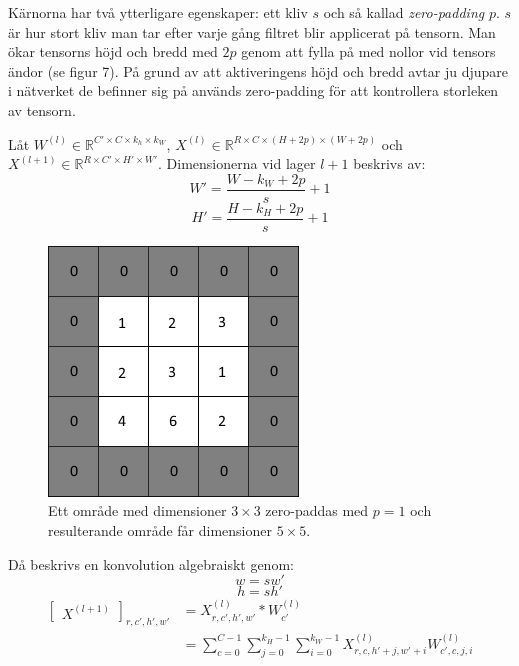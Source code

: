 \documentclass[a4paper,11pt,twoside]{article}
\begin{document}
Kärnorna har två ytterligare egenskaper: ett kliv $s$ och så kallad \textit{zero-padding} $p$. $s$ är hur stort kliv man tar efter varje gång filtret blir applicerat på tensorn. Man ökar tensorns höjd och bredd med $2p$ genom att fylla på med nollor vid tensors ändor (se figur 7). På grund av att aktiveringens höjd och bredd avtar ju djupare i nätverket de befinner sig på används zero-padding för att kontrollera storleken av tensorn. \cite{cs231n} \cite{convmath} \cite{convarithmetic}

Låt $W^{(l)} \in \mathbb{R}^{C' \times C  \times k_h \times k_W}$, $X^{(l)} \in \mathbb{R}^{R \times C  \times (H+2p) \times (W+2p)}$ och $X^{(l+1)} \in \mathbb{R}^{R \times C'  \times H' \times W'}$. Dimensionerna vid lager $l+1$ beskrivs av: \cite{cs231n} \cite{convmath} \cite{convarithmetic}
\begin{equation}
W' = \frac{W-k_W+2p}{s} +1
\end{equation}
\begin{equation}
H' = \frac{H-k_H+2p}{s} +1
\end{equation}

\begin{figure}[h]\label{figzeropad}
	\centering
  		\includegraphics[scale=0.7]{zeropadding.png}
  	\caption{Ett område med dimensioner $3 \times 3$ zero-paddas med $p=1$ och resulterande område får dimensioner $5 \times 5$.}
\end{figure}

Då beskrivs en konvolution algebraiskt genom: \cite{cs231n} \cite{convmath}
\begin{equation}
w = sw'
\end{equation}
\begin{equation}
h = sh'
\end{equation}
\begin{equation}\label{konvolution}
\begin{split}
	\begin{bmatrix} X^{(l+1)} \end{bmatrix}_{r, c', h', w'}	
		& = X^{(l)}_{r, c', h', w'} *W^{(l)}_{c'} \\
		& = \sum^{C-1}_{c=0} \sum^{k_H-1}_{j=0} \sum^{k_W-1}_{i=0} X^{(l)}_{r, c, h'+j, w'+i}W^{(l)}_{c', c, j, i}
\end{split}
\end{equation}
\end{document}
